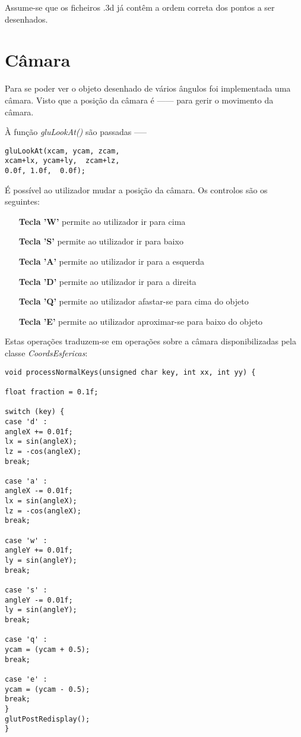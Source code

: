 Assume-se que os ficheiros .3d já contêm a ordem correta dos pontos a ser desenhados.

\section{Câmara}

Para se poder ver o objeto desenhado de vários ângulos foi implementada uma câmara.  Visto que a posição da câmara é ------ para gerir o movimento da câmara.


À função \textit{gluLookAt()} são passadas -----

\begin{Verbatim}
gluLookAt(xcam, ycam, zcam,
xcam+lx, ycam+ly,  zcam+lz,
0.0f, 1.0f,  0.0f);
\end{Verbatim}

É possível ao utilizador mudar a posição da câmara. Os controlos são os seguintes:

\begin{itemize}
	\item[\textbf{Tecla 'W'}] permite ao utilizador ir para cima
	\item[\textbf{Tecla 'S'}] permite ao utilizador ir para baixo
	\item[\textbf{Tecla 'A'}] permite ao utilizador ir para a esquerda
	\item[\textbf{Tecla 'D'}] permite ao utilizador ir para a direita
	\item[\textbf{Tecla 'Q'}] permite ao utilizador afastar-se  para cima do objeto
	\item[\textbf{Tecla 'E'}] permite ao utilizador aproximar-se para baixo do objeto
\end{itemize}

Estas operações traduzem-se em operações sobre a câmara disponibilizadas pela classe \textit{CoordsEsfericas}:

\begin{Verbatim}
void processNormalKeys(unsigned char key, int xx, int yy) {

float fraction = 0.1f;

switch (key) {
case 'd' :
angleX += 0.01f;
lx = sin(angleX);
lz = -cos(angleX);
break;

case 'a' :
angleX -= 0.01f;
lx = sin(angleX);
lz = -cos(angleX);
break;

case 'w' :
angleY += 0.01f;
ly = sin(angleY);
break;

case 's' :
angleY -= 0.01f;
ly = sin(angleY);
break;

case 'q' :
ycam = (ycam + 0.5);
break;

case 'e' :
ycam = (ycam - 0.5);
break;
}
glutPostRedisplay();
}


\end{Verbatim}

